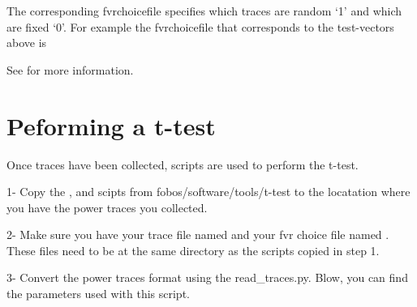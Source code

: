 \documentclass[letterpaper,10pt,english]{sphinxmanual}
\begin{document}
%
\begin{sphinxVerbatim}[commandchars=\\\{\}]
 
 
 
 
 
 
 
\end{sphinxVerbatim}
\sphinxresetverbatimhllines

The corresponding fvrchoicefile specifies which traces are random ‘1’ and which are fixed ‘0’.
For example the fvrchoicefile that corresponds to the test-vectors above is

\begin{sphinxVerbatim}[commandchars=\\\{\}]
 
\end{sphinxVerbatim}

See {\hyperref[\detokenize{tvgen:tvgen-label}]{}} for more information.


\section{Peforming a t-test}
\label{\detokenize{t_test:peforming-a-t-test}}
Once traces have been collected, scripts are used to perform the t-test.

1- Copy the ,  and   scipts from fobos/software/tools/t-test to the locatation where you have the power
traces you collected.

2- Make sure you have your trace file named  and your fvr choice file named .
These files need to be at the same directory as the scripts copied in step 1.

3- Convert the power traces format using the read\_traces.py. Blow, you can find the parameters used with this script.
\end{document}
